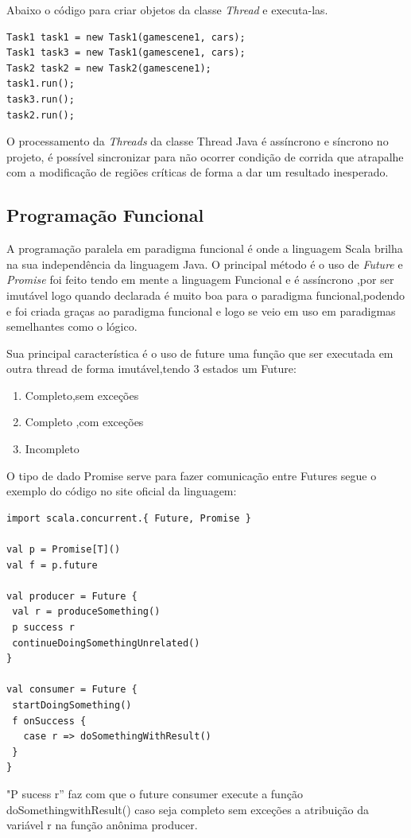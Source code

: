 \documentclass[rel-mlp]{iiufrgs}
\begin{document}
Abaixo o código para criar objetos da classe  \textit{Thread} e executa-las.
\begin{lstlisting}
Task1 task1 = new Task1(gamescene1, cars);
Task1 task3 = new Task1(gamescene1, cars);
Task2 task2 = new Task2(gamescene1);
task1.run();
task3.run();
task2.run();
\end{lstlisting}

O processamento da \textit{Threads} da classe Thread Java é assíncrono e síncrono no projeto, é possível sincronizar para não ocorrer condição de corrida que atrapalhe com a modificação de regiões críticas de forma a dar um resultado inesperado.
\newpage

\subsection{Programação Funcional}
A programação paralela em paradigma funcional é onde a linguagem Scala brilha na sua independência da linguagem Java. O principal método é o uso de \textit{Future} e \textit{Promise} foi feito tendo em mente a linguagem Funcional e é assíncrono \cite{wiki_future},por ser imutável logo quando declarada é muito boa para o paradigma funcional,podendo  e foi criada graças ao paradigma funcional e logo se veio em uso em paradigmas semelhantes como o lógico.

 Sua principal característica é o uso de future uma função que ser executada em outra thread de forma imutável,tendo 3 estados um Future:
  \begin{enumerate}
\item Completo,sem exceções
\item Completo ,com exceções
\item Incompleto
 \end{enumerate}

 O tipo de dado Promise serve para fazer comunicação entre Futures segue o exemplo do código no site oficial da linguagem:
\begin{lstlisting}
import scala.concurrent.{ Future, Promise }

val p = Promise[T]()
val f = p.future

val producer = Future {
 val r = produceSomething()
 p success r
 continueDoingSomethingUnrelated()
}

val consumer = Future {
 startDoingSomething()
 f onSuccess {
   case r => doSomethingWithResult()
 }
}
\end{lstlisting}

 "P sucess r” faz com que o future consumer execute a função doSomethingwithResult() caso seja completo sem exceções a atribuição da variável r na função anônima producer. 
  
\end{document}
